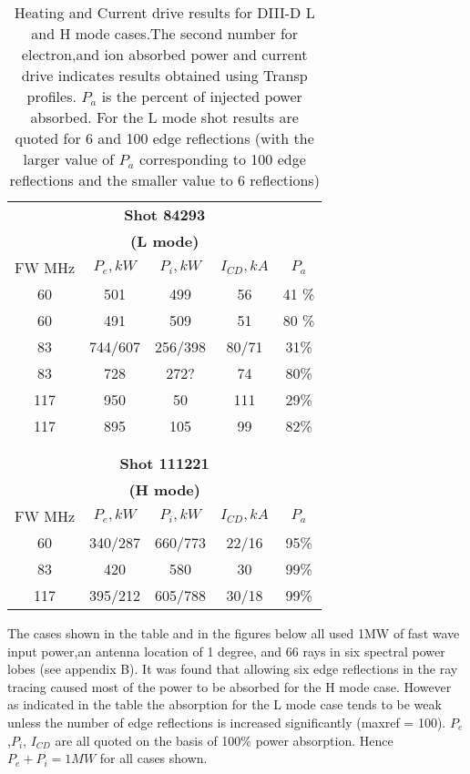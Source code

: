 \begin{table}
\begin{centering}
\begin{tabular}{ccccc}
\multicolumn{5}{c}{\bfseries Shot 84293} \\
\multicolumn{5}{c}{\bfseries (L mode) }  \\ 
FW MHz& $P_e ,kW $ & $P_i, kW  $ & $ I_{CD}, kA  $ & $P_a $ \\ \hline
60  & 501& 499 & 56& 41 \%  \\
60  & 491& 509 & 51& 80 \%  \\
83  & 744/607& 256/398  &  80/71 & 31\%   \\
83  & 728 & 272?   &  74 & 80\%   \\
117  &950  &50 & 111 & 29\%  \\
117  &895  &105 & 99 & 82\%  \\
\\ \hline
& \\
\multicolumn{5}{c}{\bfseries Shot 111221} \\
\multicolumn{5}{c}{\bfseries (H
  mode)} \\ 
FW MHz& $P_e, kW$ & $P_i ,kW $ & $ I_{CD}, kA $&  $P_a $ \\ \hline
60  &340/287& 660/773 & 22/16 & 95\% \\
83  & 420 & 580 & 30  & 99\% \\
117 & 395/212 & 605/788 & 30/18 & 99\% \\ \hline
\end{tabular}
\caption{Heating and Current drive results for DIII-D L and H
  mode cases.The second number for electron,and ion absorbed power and
  current drive indicates results obtained using Transp
  profiles. $P_a$ is the percent of injected power absorbed. For the
L mode shot results are quoted for 6  and 100 edge reflections (with
the larger value of $P_a$ corresponding to 100 edge reflections and
the smaller value to 6 reflections)}
\label{t1}
\end{centering}
\end{table} 

The cases  shown in the table and in the figures below all used 1MW of
fast wave input power,an antenna location of 1 degree, and 66 rays in six
spectral power lobes (see appendix B). 
 It was found that allowing six edge reflections
in the ray tracing caused most of the power to be absorbed for the H
mode case. However as indicated in the table the absorption for
the L mode case tends to be weak unless the number of edge reflections
is increased significantly (maxref = 100). $P_e$,$P_i$, $I_{CD}$ are
all quoted on the basis of 100\% power absorption. Hence $P_e + P_i = 1
 MW $ for all cases shown.

